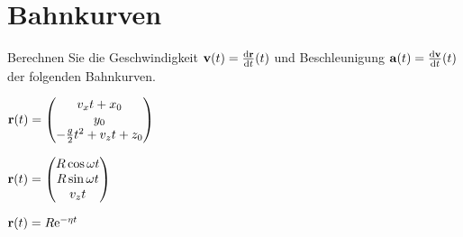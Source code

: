 \documentclass{scrartcl}
\begin{document}
\section{Bahnkurven}
\label{sec:bahnkurven}

Berechnen Sie die Geschwindigkeit $\mat v(t) = \deriv[\mat r]{t}(t)$ und Beschleunigung $\mat a(t) = \deriv[\mat v]{t}(t)$ der folgenden Bahnkurven.\\

\begin{subex*}
  \item $\mat r(t) = \colvec{v_x t + x_0 \\ y_0 \\ -\frac{g}{2} t^2 + v_z t + z_0}$
  \item $\mat r(t) = \colvec{R \cos \omega t \\ R \sin \omega t \\ v_z t}$
  \item $\mat r(t) = R \mathrm{e}^{-\eta t}$  
\end{subex*}
\end{document}

